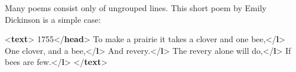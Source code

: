 Many poems consist only of ungrouped lines.                        This short poem by Emily Dickinson is a simple case: \par\bgroup{}\exampleFont \begin{shaded}\noindent\mbox{}{<\textbf{text}>}\mbox{}\newline 
{}\mbox{}\newline 
\hspace*{1em}1755{</\textbf{head}>}\mbox{}\newline 
{}\mbox{}\newline 
{}\mbox{}\newline 
\hspace*{1em}To make a prairie it takes a clover and one bee,{</\textbf{l}>}\mbox{}\newline 
\hspace*{1em}One clover, and a bee,{</\textbf{l}>}\mbox{}\newline 
\hspace*{1em}And revery.{</\textbf{l}>}\mbox{}\newline 
\hspace*{1em}The revery alone will do,{</\textbf{l}>}\mbox{}\newline 
\hspace*{1em}If bees are few.{</\textbf{l}>}\mbox{}\newline 
{}\mbox{}\newline 
{</\textbf{text}>}\end{shaded}\egroup\par \noindent    \par
